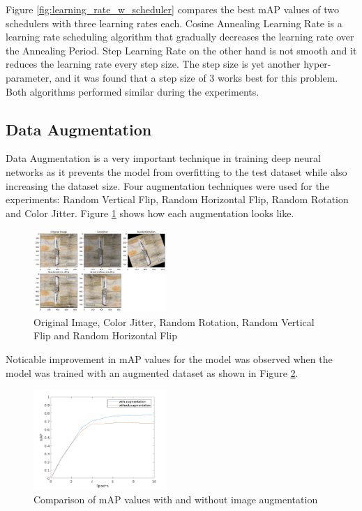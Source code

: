 \documentclass[10pt,twocolumn,letterpaper]{article}
\begin{document}
Figure \ref{fig:learning_rate_w_scheduler} compares the best mAP values of two schedulers with three learning rates
each. Cosine Annealing Learning Rate is a learning rate scheduling algorithm that gradually decreases the learning rate
over the Annealing Period. Step Learning Rate on the other hand is not smooth and it reduces the learning rate every step
size. The step size is yet another hyper-parameter, and it was found that a step size of 3 works best for this problem.
Both algorithms performed similar during the experiments.

\subsection{Data Augmentation}

Data Augmentation is a very important technique in training deep neural networks as it prevents the model from
overfitting to the test dataset while also increasing the dataset size. Four augmentation techniques were used for the
experiments: Random Vertical Flip, Random Horizontal Flip, Random Rotation and Color Jitter. Figure
\ref{fig:augmentations_preview} shows how each augmentation looks like.

\begin{figure}[H]
  \begin{center}
    \includegraphics[width=0.45\textwidth]{./assets/augmentations_preview.png}
    \captionsetup{justification=centering}
    \caption{Original Image, Color Jitter, Random Rotation, Random Vertical Flip and Random Horizontal Flip}
    \label{fig:augmentations_preview}
  \end{center}
\end{figure}

Noticable improvement in mAP values for the model was observed when the model was trained with an augmented dataset as
shown in Figure \ref{fig:augmentation_comparison}.

\begin{figure}[htbp]
  \begin{center}
    \includegraphics[width=0.45\textwidth]{./assets/augmentation_comparison.png}
    \captionsetup{justification=centering}
    \caption{Comparison of mAP values with and without image augmentation}
    \label{fig:augmentation_comparison}
  \end{center}
\end{figure}
\end{document}
